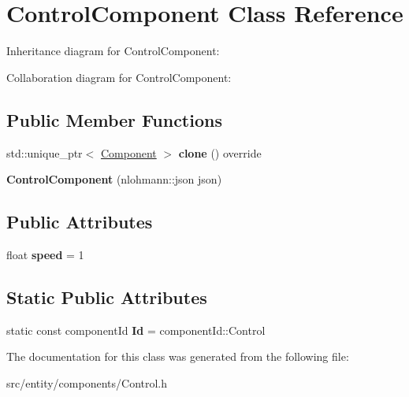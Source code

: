 \hypertarget{classControlComponent}{\section{Control\-Component Class Reference}
\label{classControlComponent}
}


Inheritance diagram for Control\-Component\-:


Collaboration diagram for Control\-Component\-:
\subsection*{Public Member Functions}
\begin{DoxyCompactItemize}
\item 
\hypertarget{classControlComponent_aaf2eb2415f762178bbcbf673c7cdfa1c}{std\-::unique\-\_\-ptr$<$ \hyperlink{classComponent}{Component} $>$ {\bfseries clone} () override}\label{classControlComponent_aaf2eb2415f762178bbcbf673c7cdfa1c}

\item 
\hypertarget{classControlComponent_a84410c1ccb6e7b1581a099c0b72fc2dd}{{\bfseries Control\-Component} (nlohmann\-::json json)}\label{classControlComponent_a84410c1ccb6e7b1581a099c0b72fc2dd}

\end{DoxyCompactItemize}
\subsection*{Public Attributes}
\begin{DoxyCompactItemize}
\item 
\hypertarget{classControlComponent_a22dc0dc5b37b679770150a5b2a9ba96e}{float {\bfseries speed} = 1}\label{classControlComponent_a22dc0dc5b37b679770150a5b2a9ba96e}

\end{DoxyCompactItemize}
\subsection*{Static Public Attributes}
\begin{DoxyCompactItemize}
\item 
\hypertarget{classControlComponent_a1a98a2363b43b0c7022474bcca912ce0}{static const component\-Id {\bfseries Id} = component\-Id\-::\-Control}\label{classControlComponent_a1a98a2363b43b0c7022474bcca912ce0}

\end{DoxyCompactItemize}


The documentation for this class was generated from the following file\-:\begin{DoxyCompactItemize}
\item 
src/entity/components/Control.\-h\end{DoxyCompactItemize}
